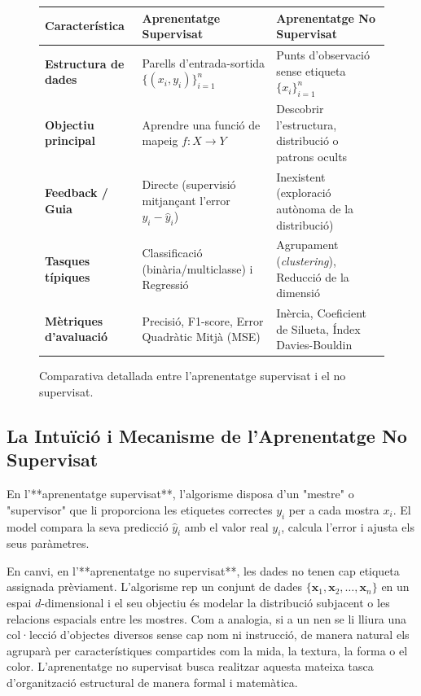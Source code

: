 \documentclass[11pt, a4paper]{article}
\begin{document}
\begin{figure}[h!]
\centering
\small
\begin{tabular}{@{}p{3.5cm}p{5.8cm}p{5.8cm}@{}}
\toprule
\textbf{Característica} & \textbf{Aprenentatge Supervisat} & \textbf{Aprenentatge No Supervisat} \\
\midrule
\textbf{Estructura de dades} & Parells d'entrada-sortida $\{(x_i, y_i)\}_{i=1}^n$ & Punts d'observació sense etiqueta $\{x_i\}_{i=1}^n$ \\
\textbf{Objectiu principal} & Aprendre una funció de mapeig $f: X \to Y$ & Descobrir l'estructura, distribució o patrons ocults \\
\textbf{Feedback / Guia} & Directe (supervisió mitjançant l'error $y_i - \hat{y}_i$) & Inexistent (exploració autònoma de la distribució) \\
\textbf{Tasques típiques} & Classificació (binària/multiclasse) i Regressió & Agrupament (\textit{clustering}), Reducció de la dimensió \\
\textbf{Mètriques d'avaluació} & Precisió, F1-score, Error Quadràtic Mitjà (MSE) & Inèrcia, Coeficient de Silueta, Índex Davies-Bouldin \\
\bottomrule
\end{tabular}
\caption{Comparativa detallada entre l'aprenentatge supervisat i el no supervisat.}
\end{figure}

\subsection{La Intuïció i Mecanisme de l'Aprenentatge No Supervisat}
En l'**aprenentatge supervisat**, l'algorisme disposa d'un "mestre" o "supervisor" que li proporciona les etiquetes correctes $y_i$ per a cada mostra $x_i$. El model compara la seva predicció $\hat{y}_i$ amb el valor real $y_i$, calcula l'error i ajusta els seus paràmetres.

En canvi, en l'**aprenentatge no supervisat**, les dades no tenen cap etiqueta assignada prèviament. L'algorisme rep un conjunt de dades $\{\mathbf{x}_1, \mathbf{x}_2, \dots, \mathbf{x}_n\}$ en un espai $d$-dimensional i el seu objectiu és modelar la distribució subjacent o les relacions espacials entre les mostres. Com a analogia, si a un nen se li lliura una col·lecció d'objectes diversos sense cap nom ni instrucció, de manera natural els agruparà per característiques compartides com la mida, la textura, la forma o el color. L'aprenentatge no supervisat busca realitzar aquesta mateixa tasca d'organització estructural de manera formal i matemàtica.
\end{document}
